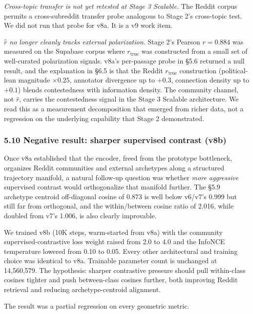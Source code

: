\documentclass[
  11pt]{article}
\begin{document}
\emph{Cross-topic transfer is not yet retested at Stage 3 Scalable.} The
Reddit corpus permits a cross-subreddit transfer probe analogous to
Stage 2's cross-topic test. We did not run that probe for v8a. It is a
v9 work item.

\emph{\(\hat{r}\) no longer cleanly tracks external polarization.} Stage
2's Pearson \(r = 0.884\) was measured on the Supabase corpus where
\(r_{\text{true}}\) was constructed from a small set of well-curated
polarization signals. v8a's per-passage probe in §5.6 returned a null
result, and the explanation in §6.5 is that the Reddit
\(r_{\text{true}}\) construction (political-lean magnitude
\(\times 0.25\), annotator divergence up to \(+0.3\), connection density
up to \(+0.1\)) blends contestedness with information density. The
community channel, not \(\hat{r}\), carries the contestedness signal in
the Stage 3 Scalable architecture. We read this as a measurement
decomposition that emerged from richer data, not a regression on the
underlying capability that Stage 2 demonstrated.

\subsubsection{5.10 Negative result: sharper supervised contrast
(v8b)}\label{negative-result-sharper-supervised-contrast-v8b}

Once v8a established that the encoder, freed from the prototype
bottleneck, organizes Reddit communities and external archetypes along a
structured trajectory manifold, a natural follow-up question was whether
\emph{more aggressive} supervised contrast would orthogonalize that
manifold further. The §5.9 archetype centroid off-diagonal cosine of
0.873 is well below v6/v7's 0.999 but still far from orthogonal, and the
within/between cosine ratio of 2.016, while doubled from v7's 1.006, is
also clearly improvable.

We trained v8b (10K steps, warm-started from v8a) with the community
supervised-contrastive loss weight raised from 2.0 to 4.0 and the
InfoNCE temperature lowered from 0.10 to 0.05. Every other architectural
and training choice was identical to v8a. Trainable parameter count is
unchanged at 14,560,579. The hypothesis: sharper contrastive pressure
should pull within-class cosines tighter and push between-class cosines
further, both improving Reddit retrieval and reducing archetype-centroid
alignment.

The result was a partial regression on every geometric metric.
\end{document}
